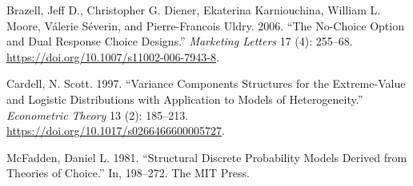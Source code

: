 \documentclass[
  letterpaper,
  DIV=11,
  numbers=noendperiod]{scrartcl}
\newlength{\cslhangindent}
\newenvironment{CSLReferences}[2] %
 {\begin{list}{}{%
  \setlength{\itemindent}{0pt}
  \setlength{\leftmargin}{0pt}
  \setlength{\parsep}{0pt}
  \ifodd #1
   \setlength{\leftmargin}{\cslhangindent}
   \setlength{\itemindent}{-1\cslhangindent}
  \fi
  \setlength{\itemsep}{#2\baselineskip}}}
 {\end{list}}
\begin{document}
\label{refs}
\begin{CSLReferences}{1}{0}
Brazell, Jeff D., Christopher G. Diener, Ekaterina Karniouchina, William
L. Moore, Válerie Séverin, and Pierre-Francois Uldry. 2006. {``The
No-Choice Option and Dual Response Choice Designs.''} \emph{Marketing
Letters} 17 (4): 255--68.
\url{https://doi.org/10.1007/s11002-006-7943-8}.

Cardell, N. Scott. 1997. {``Variance Components Structures for the
Extreme-Value and Logistic Distributions with Application to Models of
Heterogeneity.''} \emph{Econometric Theory} 13 (2): 185--213.
\url{https://doi.org/10.1017/s0266466600005727}.

McFadden, Daniel L. 1981. {``Structural Discrete Probability Models
Derived from Theories of Choice.''} In, 198--272. The MIT Press.

\end{CSLReferences}
\end{document}
